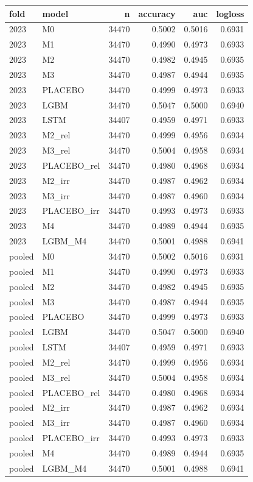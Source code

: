 \begin{tabular}{llrrrr}
\toprule
fold & model & n & accuracy & auc & logloss \\
\midrule
2023 & M0 & 34470 & 0.5002 & 0.5016 & 0.6931 \\
2023 & M1 & 34470 & 0.4990 & 0.4973 & 0.6933 \\
2023 & M2 & 34470 & 0.4982 & 0.4945 & 0.6935 \\
2023 & M3 & 34470 & 0.4987 & 0.4944 & 0.6935 \\
2023 & PLACEBO & 34470 & 0.4999 & 0.4973 & 0.6933 \\
2023 & LGBM & 34470 & 0.5047 & 0.5000 & 0.6940 \\
2023 & LSTM & 34407 & 0.4959 & 0.4971 & 0.6933 \\
2023 & M2\_rel & 34470 & 0.4999 & 0.4956 & 0.6934 \\
2023 & M3\_rel & 34470 & 0.5004 & 0.4958 & 0.6934 \\
2023 & PLACEBO\_rel & 34470 & 0.4980 & 0.4968 & 0.6934 \\
2023 & M2\_irr & 34470 & 0.4987 & 0.4962 & 0.6934 \\
2023 & M3\_irr & 34470 & 0.4987 & 0.4960 & 0.6934 \\
2023 & PLACEBO\_irr & 34470 & 0.4993 & 0.4973 & 0.6933 \\
2023 & M4 & 34470 & 0.4989 & 0.4944 & 0.6935 \\
2023 & LGBM\_M4 & 34470 & 0.5001 & 0.4988 & 0.6941 \\
pooled & M0 & 34470 & 0.5002 & 0.5016 & 0.6931 \\
pooled & M1 & 34470 & 0.4990 & 0.4973 & 0.6933 \\
pooled & M2 & 34470 & 0.4982 & 0.4945 & 0.6935 \\
pooled & M3 & 34470 & 0.4987 & 0.4944 & 0.6935 \\
pooled & PLACEBO & 34470 & 0.4999 & 0.4973 & 0.6933 \\
pooled & LGBM & 34470 & 0.5047 & 0.5000 & 0.6940 \\
pooled & LSTM & 34407 & 0.4959 & 0.4971 & 0.6933 \\
pooled & M2\_rel & 34470 & 0.4999 & 0.4956 & 0.6934 \\
pooled & M3\_rel & 34470 & 0.5004 & 0.4958 & 0.6934 \\
pooled & PLACEBO\_rel & 34470 & 0.4980 & 0.4968 & 0.6934 \\
pooled & M2\_irr & 34470 & 0.4987 & 0.4962 & 0.6934 \\
pooled & M3\_irr & 34470 & 0.4987 & 0.4960 & 0.6934 \\
pooled & PLACEBO\_irr & 34470 & 0.4993 & 0.4973 & 0.6933 \\
pooled & M4 & 34470 & 0.4989 & 0.4944 & 0.6935 \\
pooled & LGBM\_M4 & 34470 & 0.5001 & 0.4988 & 0.6941 \\
\bottomrule
\end{tabular}
